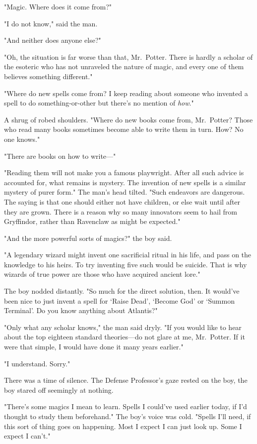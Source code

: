 "Magic. Where does it come from?"

"I do not know," said the man.

"And neither does anyone else?"

"Oh, the situation is far worse than that, Mr.~Potter. There is hardly a 
scholar of the esoteric who has not unraveled the nature of magic, and every 
one of them believes something different."

"Where do new spells come from? I keep reading about someone who invented a 
spell to do something-or-other but there's no mention of \emph{how}."

A shrug of robed shoulders. "Where do new books come from, Mr.~Potter? Those 
who read many books sometimes become able to write them in turn. How? No one 
knows."

"There are books on how to write---"

"Reading them will not make you a famous playwright. After all such advice is 
accounted for, what remains is mystery. The invention of new spells is a 
similar mystery of purer form." The man's head tilted. "Such endeavors are 
dangerous. The saying is that one should either not have children, or else wait 
until after they are grown. There is a reason why so many innovators seem to 
hail from Gryffindor, rather than Ravenclaw as might be expected."

"And the more powerful sorts of magics?" the boy said.

"A legendary wizard might invent one sacrificial ritual in his life, and pass 
on the knowledge to his heirs. To try inventing five such would be suicide. 
That is why wizards of true power are those who have acquired ancient lore."

The boy nodded distantly. "So much for the direct solution, then. It would've 
been nice to just invent a spell for `Raise Dead', `Become God' or `Summon 
Terminal'. Do you know anything about Atlantis?"

"Only what any scholar knows," the man said dryly. "If you would like to hear 
about the top eighteen standard theories---do not glare at me, Mr.~Potter. If 
it were that simple, I would have done it many years earlier."

"I understand. Sorry."

There was a time of silence. The Defense Professor's gaze rested on the boy, 
the boy stared off seemingly at nothing.

"There's some magics I mean to learn. Spells I could've used earlier today, if 
I'd thought to study them beforehand." The boy's voice was cold. "Spells I'll 
need, if this sort of thing goes on happening. Most I expect I can just look 
up. Some I expect I can't."

